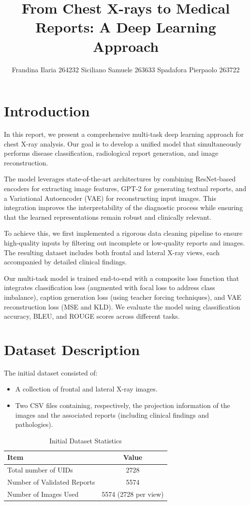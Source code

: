 \documentclass[a4paper,12pt]{article}
\title{From Chest X-rays to Medical Reports: A Deep Learning Approach}
\author{Frandina Ilaria 264232 \quad Siciliano Samuele 263633 \quad Spadafora Pierpaolo 263722}
\date{}
\begin{document}
\maketitle

\section{Introduction}
In this report, we present a comprehensive multi-task deep learning approach for chest X-ray analysis. Our goal is to develop a unified model that simultaneously performs disease classification, radiological report generation, and image reconstruction.

The model leverages state-of-the-art architectures by combining ResNet-based encoders for extracting image features, GPT-2 for generating textual reports, and a Variational Autoencoder (VAE) for reconstructing input images. This integration improves the interpretability of the diagnostic process while ensuring that the learned representations remain robust and clinically relevant.

To achieve this, we first implemented a rigorous data cleaning pipeline to ensure high-quality inputs by filtering out incomplete or low-quality reports and images. The resulting dataset includes both frontal and lateral X-ray views, each accompanied by detailed clinical findings.

Our multi-task model is trained end-to-end with a composite loss function that integrates classification loss (augmented with focal loss to address class imbalance), caption generation loss (using teacher forcing techniques), and VAE reconstruction loss (MSE and KLD). We evaluate the model using classification accuracy, BLEU, and ROUGE scores across different tasks.

\section{Dataset Description}
The initial dataset consisted of:
\begin{itemize}
    \item A collection of frontal and lateral X-ray images.
    \item Two CSV files containing, respectively, the projection information of the images and the associated reports (including clinical findings and pathologies).
\end{itemize}

\begin{table}[H]
\centering
\begin{tabular}{l c}
\toprule
\textbf{Item} & \textbf{Value} \\
\midrule
Total number of UIDs & 2728 \\
Number of Validated Reports & 5574 \\
Number of Images Used & 5574 (2728 per view) \\
\bottomrule
\end{tabular}
\caption{Initial Dataset Statistics}
\label{tab:dataset_stats}
\end{table}
\end{document}
